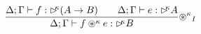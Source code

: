 \[
\frac { \Delta ;\Gamma \vdash f: \rhd^{\!\!\kappa}(A\to B)\quad \quad \Delta;\Gamma \vdash e : \rhd^{\!\!\kappa} A }{ \Delta;\Gamma \vdash f \circledast^{\kappa} e : \rhd^{\!\!\kappa} B } { \circledast^{\kappa} }_{ I }
\]
